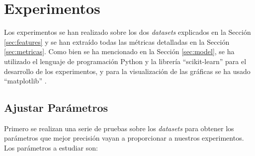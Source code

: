 \section{Experimentos} \label{sec:experimentos}

\noindent Los experimentos se han realizado sobre los dos \textit{datasets} explicados en la Sección \ref{sec:features} y se han extraído todas las métricas detalladas en la Sección \ref{sec:metricas}. Como bien se ha mencionado en la Sección \ref{sec:model}, se ha utilizado el lenguaje de programación Python y la librería ``scikit-learn'' \cite{scikit-learn} para el desarrollo de los experimentos, y para la visualización de las gráficas se ha usado ``matplotlib'' \cite{matplotlib}.


\subsection{Ajustar Parámetros} \label{adjust}
\noindent Primero se realizan una serie de pruebas sobre los \textit{datasets} para obtener los parámetros que mejor precisión vayan a proporcionar a nuestros experimentos. Los parámetros a estudiar son: 
